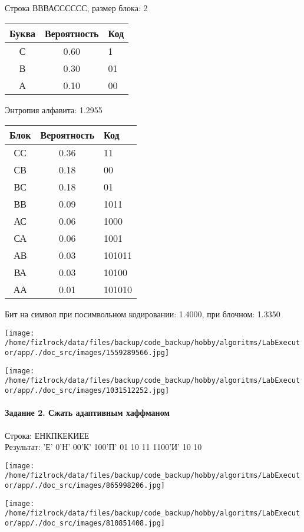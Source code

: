 \documentclass[a4paper, 12pt]{article}
\begin{document}
Строка ВВВАСССССС, размер блока: 2
\begin{center}
 \begin{tabular}{ |c|c|l| } 
  \hline
     Буква & Вероятность & Код\\ \hline
С & 0.60 & 1\\\hline
В & 0.30 & 01\\\hline
А & 0.10 & 00
\\ \hline \end{tabular}
\end{center}
Энтропия алфавита: 1.2955
\begin{center}
 \begin{tabular}{ |c|c|l| } 
  \hline
     Блок & Вероятность & Код\\ \hline
СС & 0.36 & 11\\\hline
СВ & 0.18 & 00\\\hline
ВС & 0.18 & 01\\\hline
ВВ & 0.09 & 1011\\\hline
АС & 0.06 & 1000\\\hline
СА & 0.06 & 1001\\\hline
АВ & 0.03 & 101011\\\hline
ВА & 0.03 & 10100\\\hline
АА & 0.01 & 101010
\\ \hline \end{tabular}
\end{center}
Бит на символ при посимвольном кодировании: 1.4000, при блочном: 1.3350

\texttt{[image: /home/fizlrock/data/files/backup/code\_backup/hobby/algoritms/LabExecutor/app/./doc\_src/images/1559289566.jpg]}

\texttt{[image: /home/fizlrock/data/files/backup/code\_backup/hobby/algoritms/LabExecutor/app/./doc\_src/images/1031512252.jpg]}
\pagebreak
\paragraph{Задание 2. Сжать адаптивным хаффманом\\}

Строка: 
ЕНКПКЕКИЕЕ\\
Результат: 'Е' 0'Н' 00'К' 100'П' 01 10 11 1100'И' 10 10

\texttt{[image: /home/fizlrock/data/files/backup/code\_backup/hobby/algoritms/LabExecutor/app/./doc\_src/images/865998206.jpg]}

\texttt{[image: /home/fizlrock/data/files/backup/code\_backup/hobby/algoritms/LabExecutor/app/./doc\_src/images/810851408.jpg]}
\end{document}
